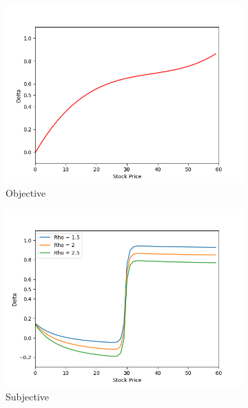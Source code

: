 \vspace*{15pt}
\begin{figure}[H]
    \centering
    \begin{subfigure}{0.32\textwidth}
        \centering
        \includegraphics[width=\textwidth]{fig/4/delta_obj.png}
        \caption{Objective}
        \label{fig:rn_delta_obj}
    \end{subfigure}
    \hfill
    \begin{subfigure}{0.32\textwidth}
        \centering
        \includegraphics[width=\textwidth]{fig/4/delta_subj.png}
        \caption{Subjective}
        \label{fig:rn_delta_subj}
    \end{subfigure}
    \hfill
    \begin{subfigure}{0.32\textwidth}

\end{subfigure}
\end{figure}
